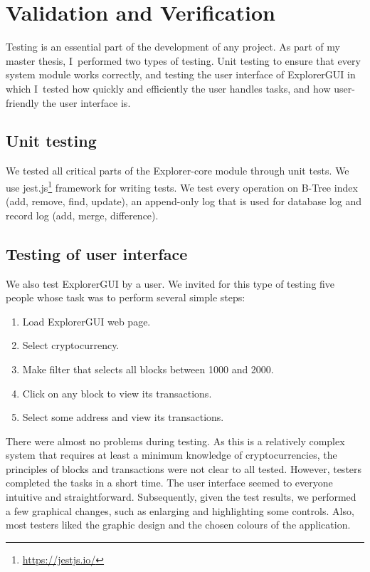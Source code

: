 \chapter{Validation and Verification}


Testing is an essential part of the development of any project. As part of my master thesis, I~performed two types of testing. Unit testing to ensure that every system module works correctly, and testing the user interface of ExplorerGUI in which I~tested how quickly and efficiently the user handles tasks, and how user-friendly the user interface is.

\section{Unit testing}
We tested all critical parts of the Explorer-core module through unit tests. We use jest.js\footnote{\url{https://jestjs.io/}} framework for writing tests. We test every operation on B-Tree index (add, remove, find, update), an append-only log that is used for database log and record log (add, merge, difference).


\section{Testing of user interface}
We also test ExplorerGUI by a user. We invited for this type of testing five people whose task was to perform several simple steps:
\begin{enumerate}
    \item Load ExplorerGUI web page.
    \item Select cryptocurrency.
    \item Make filter that selects all blocks between 1000 and 2000.
    \item Click on any block to view its transactions.
    \item Select some address and view its transactions.
\end{enumerate}
There were almost no problems during testing. As this is a relatively complex system that requires at least a minimum knowledge of cryptocurrencies, the principles of blocks and transactions were not clear to all tested. However, testers completed the tasks in a short time. The user interface seemed to everyone intuitive and straightforward. Subsequently, given the test results, we performed a few graphical changes, such as enlarging and highlighting some controls. Also, most testers liked the graphic design and the chosen colours of the application.